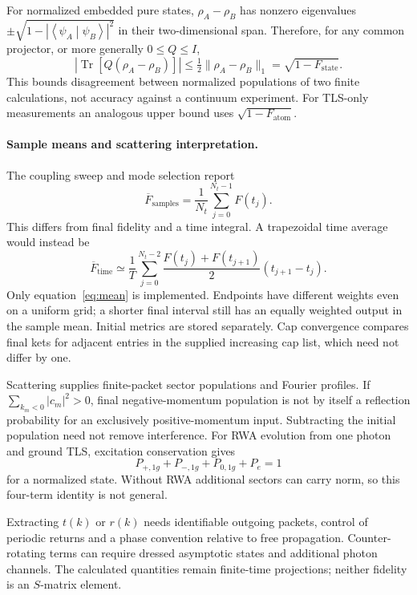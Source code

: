 \documentclass[11pt,a4paper]{article}
\newcommand{\braket}[2]{\left\langle#1\middle|#2\right\rangle}
\newcommand{\Tr}{\operatorname{Tr}}
\begin{document}
For normalized embedded pure states, $\rho_A-\rho_B$ has nonzero eigenvalues
$\pm\sqrt{1-|\braket{\psi_A}{\psi_B}|^2}$ in their two-dimensional span.
Therefore, for any common projector, or more generally $0\leq Q\leq I$,
\begin{equation}
 |\Tr[Q(\rho_A-\rho_B)]|
 \leq\tfrac12\|\rho_A-\rho_B\|_1=\sqrt{1-F_{\mathrm{state}}}.
 \label{eq:bound}
\end{equation}
This bounds disagreement between normalized populations of two finite
calculations, not accuracy against a continuum experiment. For TLS-only
measurements an analogous upper bound uses $\sqrt{1-F_{\mathrm{atom}}}$.

\paragraph{Sample means and scattering interpretation.}
The coupling sweep and mode selection report
\begin{equation}
 \overline F_{\mathrm{samples}}=\frac1{N_t}\sum_{j=0}^{N_t-1}F(t_j).
 \label{eq:mean}
\end{equation}
This differs from final fidelity and a time integral. A trapezoidal time
average would instead be
\begin{equation}
 \overline F_{\mathrm{time}}\simeq\frac1T\sum_{j=0}^{N_t-2}
       \frac{F(t_j)+F(t_{j+1})}{2}(t_{j+1}-t_j).
 \label{eq:quadrature}
\end{equation}
Only equation~\eqref{eq:mean} is implemented. Endpoints have different weights
even on a uniform grid; a shorter final interval still has an equally weighted
output in the sample mean. Initial metrics are stored separately. Cap convergence
compares final kets for adjacent entries in the supplied increasing cap list,
which need not differ by one.

Scattering supplies finite-packet sector populations and Fourier profiles.
If $\sum_{k_m<0}|c_m|^2>0$, final negative-momentum population is not by itself
a reflection probability for an exclusively positive-momentum input.
Subtracting the initial population need not remove interference.
For RWA evolution from one photon and ground TLS, excitation conservation gives
\begin{equation}
 P_{+,1g}+P_{-,1g}+P_{0,1g}+P_e=1
 \label{eq:rwasectors}
\end{equation}
for a normalized state. Without RWA additional sectors can carry norm, so
this four-term identity is not general.

Extracting $t(k)$ or $r(k)$ needs identifiable outgoing packets, control of
periodic returns and a phase convention relative to free propagation.
Counter-rotating terms can require dressed asymptotic states and additional
photon channels. The calculated quantities remain finite-time projections;
neither fidelity is an $S$-matrix element.
\end{document}
